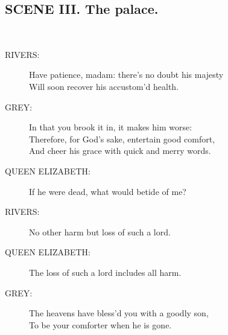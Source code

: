 \documentclass{article}
\begin{document}
\subsection*{SCENE III.  The palace.}
\\
\begin{description}
\item[RIVERS:] 
\hspace{1pt}Have patience, madam: there's no doubt his majesty\\
\hspace{1pt}Will soon recover his accustom'd health.\\
\end{description}
\begin{description}
\item[GREY:] 
\hspace{1pt}In that you brook it in, it makes him worse:\\
\hspace{1pt}Therefore, for God's sake, entertain good comfort,\\
\hspace{1pt}And cheer his grace with quick and merry words.\\
\end{description}
\begin{description}
\item[QUEEN ELIZABETH:] 
\hspace{1pt}If he were dead, what would betide of me?\\
\end{description}
\begin{description}
\item[RIVERS:] 
\hspace{1pt}No other harm but loss of such a lord.\\
\end{description}
\begin{description}
\item[QUEEN ELIZABETH:] 
\hspace{1pt}The loss of such a lord includes all harm.\\
\end{description}
\begin{description}
\item[GREY:] 
\hspace{1pt}The heavens have bless'd you with a goodly son,\\
\hspace{1pt}To be your comforter when he is gone.\\
\end{description}
\end{document}
